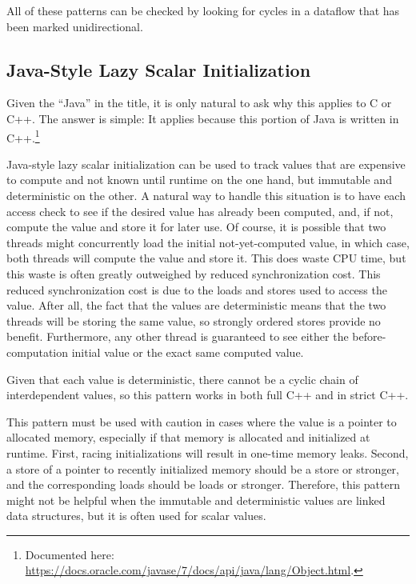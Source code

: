\documentclass[10]{article}
\begin{document}
All of these patterns can be checked by looking for cycles in a dataflow
that has been marked unidirectional.

\subsection{Java-Style Lazy Scalar Initialization}
\label{sec:Java-Style Lazy Scalar Initialization}

Given the ``Java'' in the title, it is only natural to ask why this
applies to C or C++.
The answer is simple:
It applies because this portion of Java is written in C++.\footnote{
	Documented here:
	\url{https://docs.oracle.com/javase/7/docs/api/java/lang/Object.html}.}

Java-style lazy scalar initialization can be used to track values that
are expensive to compute and not known until runtime on the one hand,
but immutable and deterministic on the other.
A natural way to handle this situation is to have each access check
to see if the desired value has already been computed, and, if not,
compute the value and store it for later use.
Of course, it is possible that two threads might concurrently load
the initial not-yet-computed value, in which case, both threads
will compute the value and store it.
This does waste CPU time, but this waste is often greatly outweighed by
reduced synchronization cost.
This reduced synchronization cost is due to the 
loads and stores used to access the value.
After all, the fact that the values are deterministic means that
the two threads will be storing the same value, so strongly ordered
stores provide no benefit.
Furthermore, any other thread is guaranteed to see either the
before-computation initial value or the exact same computed value.

Given that each value is deterministic, there cannot be a cyclic chain
of interdependent values, so this pattern works in both full C++ and in
strict C++.

This pattern must be used with caution in cases where the value is
a pointer to allocated memory, especially if that memory is allocated
and initialized at runtime.
First, racing initializations will result in one-time memory leaks.
Second, a store of a pointer to recently initialized memory should
be a  store or stronger, and the corresponding
loads should be  loads or stronger.
Therefore, this pattern might not be helpful when the immutable and
deterministic values are linked data structures, but it is often used
for scalar values.
\end{document}

